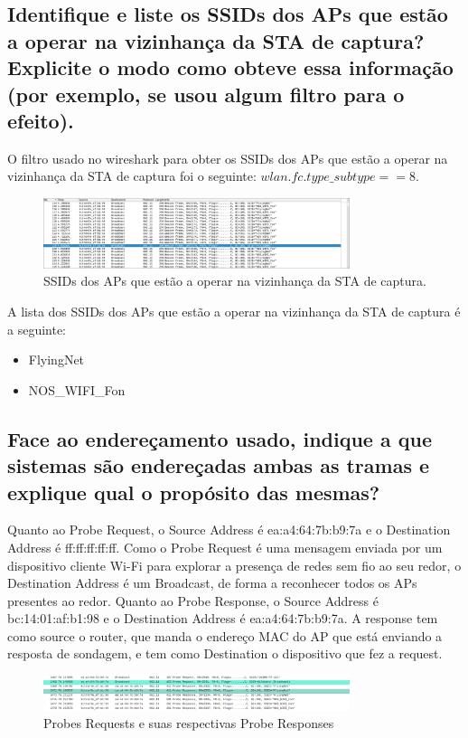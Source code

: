 \documentclass{article}
\begin{document}
\subsection{Identifique e liste os SSIDs dos APs que estão a operar na vizinhança da STA de  captura? Explicite o modo como obteve essa informação (por exemplo, se usou  algum filtro para o efeito).}

O filtro usado no wireshark para obter os SSIDs dos APs que estão a operar na vizinhança da STA de captura foi o seguinte: \(wlan.fc.type\_subtype == 8\).

\begin{figure}[h]
    \centering
    \includegraphics[width=0.8\textwidth]{images/ssids.png}
    \caption{\label{fig:ssids}SSIDs dos APs que estão a operar na vizinhança da STA de captura.}
\end{figure}

A lista dos SSIDs dos APs que estão a operar na vizinhança da STA de captura é a seguinte:
\begin{itemize}
    \item FlyingNet
    \item NOS\_WIFI\_Fon
\end{itemize}

\subsection{Face ao endereçamento usado, indique a que sistemas são endereçadas ambas as tramas e explique qual o propósito das mesmas?}

Quanto ao Probe Request, o Source Address é ea:a4:64:7b:b9:7a e o Destination Address é ff:ff:ff:ff:ff. Como o Probe Request é uma mensagem enviada por um dispositivo cliente Wi-Fi para explorar a presença de redes sem fio ao seu redor, o Destination Address é um Broadcast, de forma a reconhecer todos os APs presentes ao redor.
Quanto ao Probe Response, o Source Address é bc:14:01:af:b1:98 e o Destination Address é ea:a4:64:7b:b9:7a. A response tem como source o router, que manda o endereço MAC do AP que está enviando a resposta de sondagem, e tem como Destination o dispositivo que fez a request.

\begin{figure}[h]
    \centering
    \includegraphics[width=0.8\textwidth]{images/responserequest.png}
    \caption{\label{fig:responserequest}Probes Requests e suas respectivas Probe Responses}
\end{figure}
\end{document}
